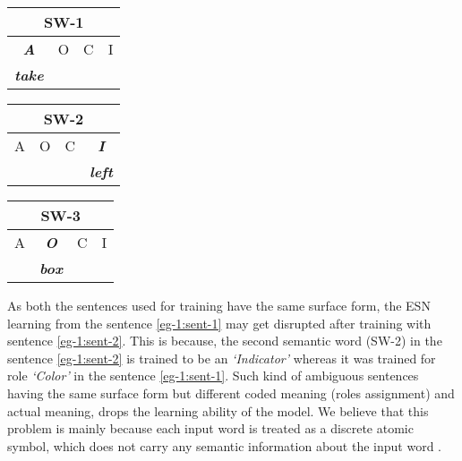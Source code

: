 \begin{table}[H]
\centering
\begin{minipage}{1.5in}
\begin{tabular}{|c|c|c|c|}
\hline
\multicolumn{4}{|c|}{\textbf{SW-1}}   \\ \hline
\textit{\textbf{A}}    & O & C & I \\ \hline
\textit{\textbf{take}} &   &   &  \\  \hline
\end{tabular}
\end{minipage}
\begin{minipage}{1.5in}
\begin{tabular}{|c|c|c|c|}
\hline
\multicolumn{4}{|c|}{\textbf{SW-2}}                    \\ \hline
A       & O & C    & \textit{\textbf{I}} \\ \hline
 &   &  & \textit{\textbf{left}} \\ \hline
\end{tabular}
\end{minipage}
\begin{minipage}{1.5in}
\begin{tabular}{|c|c|c|c|}
\hline
\multicolumn{4}{|c|}{\textbf{SW-3}}                                  \\ \hline
A                  & \textit{\textbf{O}}   & C                  & I \\ \hline
 & \textit{\textbf{box}} & \textit{\textbf{}} &   \\ \hline
\end{tabular}
\end{minipage}
\end{table}

As both the sentences used for training have the same surface form, the ESN learning from the sentence \ref{eg-1:sent-1} may get disrupted after training with sentence \ref{eg-1:sent-2}. This is because, the second semantic word (SW-2) in the sentence \ref{eg-1:sent-2} is trained to be an \textit{`Indicator'} whereas it was trained for role \textit{`Color'} in the sentence \ref{eg-1:sent-1}. Such kind of ambiguous sentences having the same surface form but different coded meaning (roles assignment) and actual meaning, drops the learning ability of the model. We believe that this problem is mainly because each input word is treated as a discrete atomic symbol, which does not carry any semantic information about the input word \cite{w2v:tensor_flow}.

